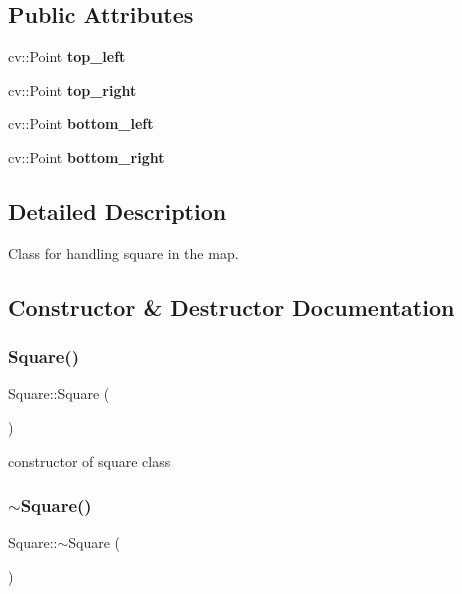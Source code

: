 \subsection*{Public Attributes}
\begin{DoxyCompactItemize}
\item 
\mbox{\label{class_square_abdd8047e5db274c6b922f34f643f8562}} 
cv\+::\+Point {\bfseries top\+\_\+left}
\item 
\mbox{\label{class_square_aa26b32ab1e6d7200569738ae8884b6db}} 
cv\+::\+Point {\bfseries top\+\_\+right}
\item 
\mbox{\label{class_square_a7f4aab58da2d211b1171473bc664a58a}} 
cv\+::\+Point {\bfseries bottom\+\_\+left}
\item 
\mbox{\label{class_square_a8168b0e4895ccd5f9166e58fccf79f6d}} 
cv\+::\+Point {\bfseries bottom\+\_\+right}
\end{DoxyCompactItemize}


\subsection{Detailed Description}
Class for handling square in the map. 

\subsection{Constructor \& Destructor Documentation}
\mbox{\label{class_square_a3dc7ff9aefc2725172b5d3153973d243}} 
\subsubsection{\texorpdfstring{Square()}{Square()}}
{\footnotesize\ttfamily Square\+::\+Square (\begin{DoxyParamCaption}{ }\end{DoxyParamCaption})}

constructor of square class \mbox{\label{class_square_a90af7ce1060cff7b717ceddb333846b8}} 
\subsubsection{\texorpdfstring{$\sim$\+Square()}{~Square()}}
{\footnotesize\ttfamily Square\+::$\sim$\+Square (\begin{DoxyParamCaption}{ }\end{DoxyParamCaption})}

